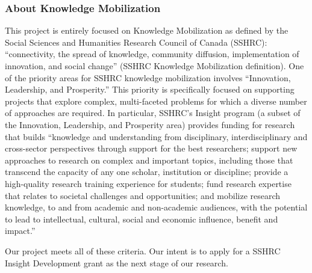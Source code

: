 \documentclass[letterpaper,10pt,headsepline]{scrreprt}
\begin{document}
\subsubsection{About Knowledge Mobilization}

This project is entirely focused on Knowledge Mobilization as defined by the
Social Sciences and Humanities Research Council of Canada (SSHRC):
``connectivity, the spread of knowledge, community diffusion, implementation
of innovation, and social change'' (SSHRC Knowledge Mobilization definition).
One of the priority areas for SSHRC knowledge mobilization involves ``Innovation,
Leadership, and Prosperity.'' This priority is specifically focused on
supporting projects that explore complex, multi-faceted problems for which a
diverse number of approaches are required. In particular, SSHRC's Insight
program (a subset of the Innovation, Leadership, and Prosperity area) provides
funding for research that builds ``knowledge and understanding from
disciplinary, interdisciplinary and cross-sector perspectives through
support for the best researchers; support new approaches to research on
complex and important topics, including those that transcend the capacity of
any one scholar, institution or discipline; provide a high-quality research
training experience for students; fund research expertise that relates to
societal challenges and opportunities; and mobilize research knowledge, to and
from academic and non-academic audiences, with the potential to lead to
intellectual, cultural, social and economic influence, benefit and impact.''

Our project meets all of these criteria. Our intent is to apply for a SSHRC
Insight Development grant as the next stage of our research.
\end{document}
